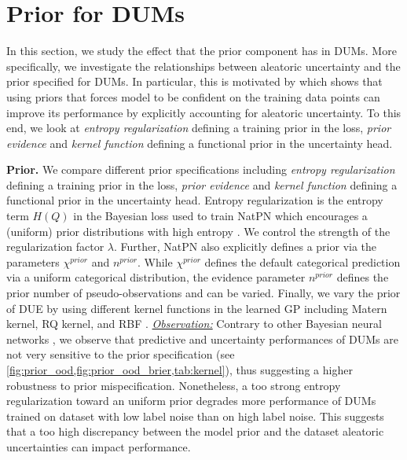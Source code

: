 \section{Prior for DUMs}
\label{sec:prior}

In this section, we study the effect that the prior component has in DUMs. More specifically, we investigate the relationships between aleatoric uncertainty and the prior specified for DUMs. In particular, this is motivated by \citet{kapoor2022prior_cpe} which shows that using priors that forces model to be confident on the training data points can improve its performance by explicitly accounting for aleatoric uncertainty.
To this end, we look at \textit{entropy regularization} defining a training prior in the loss, \textit{prior evidence} and \textit{kernel function} defining a functional prior in the uncertainty head.

\textbf{Prior.} We compare different prior specifications including \textit{entropy regularization} defining a training prior in the loss, \textit{prior evidence} and \textit{kernel function} defining a functional prior in the uncertainty head. Entropy regularization is the entropy term $H(Q)$ in the Bayesian loss used to train NatPN which encourages a (uniform) prior distributions with high entropy \citep{NatPN2021}. We control the strength of the regularization factor $\lambda$. Further, NatPN also explicitly defines a prior via the parameters $\chi^{prior}$ and $n^{prior}$. While  $\chi^{prior}$ defines the default categorical prediction via a uniform categorical distribution, the evidence parameter $n^{prior}$ defines the prior number of pseudo-observations and can be varied. Finally, we vary the prior of DUE by using different kernel functions in the learned GP including Matern kernel, RQ kernel, and RBF \citep{gp-for-ml}. \underline{\textit{Observation:}} Contrary to other Bayesian neural networks \citep{kapoor2022prior_cpe}, we observe that predictive and uncertainty performances of DUMs are not very sensitive to the prior specification (see \cref{fig:prior_ood,fig:prior_ood_brier,tab:kernel}), thus suggesting a higher robustness to prior mispecification. Nonetheless, a too strong entropy regularization toward an uniform prior degrades more performance of DUMs trained on dataset with low label noise than on high label noise. This suggests that a too high discrepancy between the model prior and the dataset aleatoric uncertainties can impact performance.

